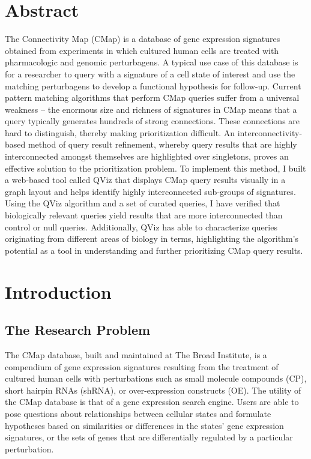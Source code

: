 \documentclass[12pt]{article}
\begin{document}
\doublespacing

\section{Abstract}
The Connectivity Map (CMap) is a database of gene expression signatures obtained from experiments in which cultured human cells are treated with pharmacologic and genomic perturbagens. A typical use case of this database is for a researcher to query with a signature of a cell state of interest and use the matching perturbagens to develop a functional hypothesis for follow-up. Current pattern matching algorithms that perform CMap queries suffer from a universal weakness -- the enormous size and richness of signatures in CMap means that a query typically generates hundreds of strong connections. These connections are hard to distinguish, thereby making prioritization difficult. An interconnectivity-based method of query result refinement, whereby query results that are highly interconnected amongst themselves are highlighted over singletons, proves an effective solution to the prioritization problem. To implement this method, I built a web-based tool called QViz that displays CMap query results visually in a graph layout and helps identify highly interconnected sub-groups of signatures. Using the QViz algorithm and a set of curated queries, I have verified that biologically relevant queries yield results that are more interconnected than control or null queries. Additionally, QViz has able to characterize queries originating from different areas of biology in terms, highlighting the algorithm's potential as a tool in understanding and further prioritizing CMap query results.

\newpage
\mbox{}

\tableofcontents


\listoffigures

\section{Introduction}

\subsection{The Research Problem}

The CMap database, built and maintained at The Broad Institute, is a compendium of gene expression signatures resulting from the treatment of cultured human cells with perturbations such as small molecule compounds (CP), short hairpin RNAs (shRNA), or over-expression constructs (OE). The utility of the CMap database is that of a gene expression search engine. Users are able to pose questions about relationships between cellular states and formulate hypotheses based on similarities or differences in the states' gene expression signatures, or the sets of genes that are differentially regulated by a particular perturbation.
\end{document}
